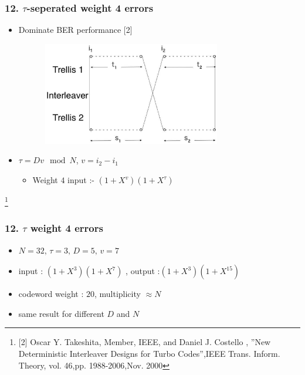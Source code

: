 \documentclass{beamer}  %
\newcommand\blfootnote[1]{%
  \begingroup
  \renewcommand\thefootnote{}\footnote{#1}%
  \addtocounter{footnote}{-1}%
  \endgroup
}
\begin{document}
\begin{frame}
\frametitle{12.  $\tau$-seperated weight 4 errors}
\begin{itemize}
\item Dominate BER performance [2]



\begin{center}
\includegraphics[height = 4.5cm,width=0.8\textwidth]{weight4.eps}
\end{center}


 \item $\tau = Dv  \mod N$, $v=i_2-i_1$

\begin{itemize}
\item Weight $4$ input :- $ (1+X^v)(1+X^{\tau})$

 
 
\end{itemize}

\end{itemize}
\blfootnote {[2] Oscar Y. Takeshita, Member, IEEE, and Daniel J. Costello ,
''New Deterministic Interleaver Designs for Turbo Codes'',IEEE Trans. Inform. 
Theory, vol.  46,pp. 1988-2006,Nov. 2000}
\end{frame}



\begin{frame}
\frametitle{12.  $\tau$ weight 4 errors}


\begin{example}
\begin{itemize}
\item  $N=32,\, \tau=3, \, D=5,\, v=7$

\item input : $(1+X^3)(1+X^7)$  , output :$(1+ X^3)(1+X^{15})$


\end{itemize}



\end{example}
\begin{itemize}
\setlength\itemsep{2em}

\item codeword weight : $20$, multiplicity $\approx N$

\item same result for different $D$ and $N$
\end{itemize}



\end{frame}
\end{document}
